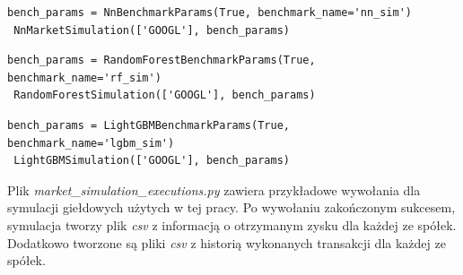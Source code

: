 \documentclass[a4paper, twoside, 11pt, openright]{article}
\begin{document}
\begin{lstlisting}[caption={Przykładowe wywołanie symulacji giełdy dla modelu sieci neuronowej (plik \textit{market\_simulation.py}).}, label={code:mlpsim},frame=single, captionpos=b, mathescape=true]
 bench_params = NnBenchmarkParams(True, benchmark_name='nn_sim')
 NnMarketSimulation(['GOOGL'], bench_params)
\end{lstlisting}

\begin{lstlisting}[caption={Przykładowe wywołanie symulacji giełdy dla modelu lasu losowego (plik \textit{market\_simulation.py}).}, label={code:rfsim},frame=single, captionpos=b, mathescape=true]
 bench_params = RandomForestBenchmarkParams(True, benchmark_name='rf_sim')
 RandomForestSimulation(['GOOGL'], bench_params)
\end{lstlisting}

\begin{lstlisting}[caption={Przykładowe wywołanie symulacji giełdy dla modelu \textit{Light GBM} (plik \textit{market\_simulation.py}).}, label={code:lgbmsim},frame=single, captionpos=b, mathescape=true]
 bench_params = LightGBMBenchmarkParams(True, benchmark_name='lgbm_sim')
 LightGBMSimulation(['GOOGL'], bench_params)
\end{lstlisting}

Plik \textit{market\_simulation\_executions.py} zawiera przykładowe wywołania dla symulacji giełdowych użytych w tej pracy. Po wywołaniu zakończonym sukcesem, symulacja tworzy plik \textit{csv} z informacją o otrzymanym zysku dla każdej ze spółek. Dodatkowo tworzone są pliki \textit{csv} z historią wykonanych transakcji dla każdej ze spółek.
\end{document}
